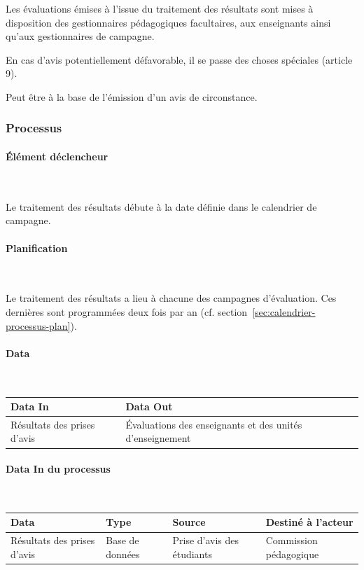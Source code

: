 \documentclass[a4paper,11pt]{report}
\begin{document}
Les évaluations émises à l'issue du traitement des résultats sont mises à disposition des gestionnaires pédagogiques facultaires, aux enseignants ainsi qu'aux gestionnaires de campagne.

En cas d'avis potentiellement défavorable, il se passe des choses spéciales (article 9).

Peut être à la base de l'émission d'un avis de circonstance.


\subsubsection{Processus}
\paragraph{Élément déclencheur}~\newline{}

Le traitement des résultats débute à la date définie dans le calendrier de campagne.

\paragraph{Planification}~\newline{}

Le traitement des résultats a lieu à chacune des campagnes d'évaluation.
Ces dernières sont programmées deux fois par an (cf. section~\ref{sec:calendrier-processus-plan}).

\paragraph{Data}~\newline{}

\begin{tabularx}{\linewidth}{|X|X|} \hline
Data In & Data Out \\ \hline
Résultats des prises d'avis & Évaluations des enseignants et des unités d'enseignement\\ \hline
\end{tabularx}

\paragraph{Data In du processus}~\newline{}

\begin{tabularx}{\linewidth}{|X|X|X|X|} \hline
Data & Type & Source & Destiné à l'acteur \\ \hline
Résultats des prises d'avis & Base de données & Prise d'avis des étudiants & Commission pédagogique \\ \hline
\end{tabularx}
\end{document}
